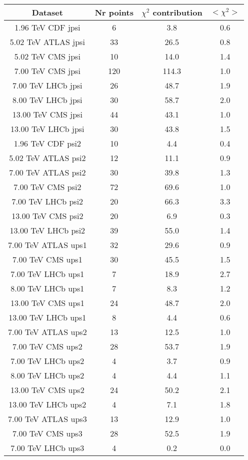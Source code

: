 \begin{table}[h!]
\centering
\begin{tabular}{c|c|c|c}
Dataset & Nr points & $\chi^2$ contribution & $<\chi^2>$ \\
\hline
1.96 TeV CDF jpsi & 6 & 3.8 & 0.6 \\
5.02 TeV ATLAS jpsi & 33 & 26.5 & 0.8 \\
5.02 TeV CMS jpsi & 10 & 14.0 & 1.4 \\
7.00 TeV CMS jpsi & 120 & 114.3 & 1.0 \\
7.00 TeV LHCb jpsi & 26 & 48.7 & 1.9 \\
8.00 TeV LHCb jpsi & 30 & 58.7 & 2.0 \\
13.00 TeV CMS jpsi & 44 & 43.1 & 1.0 \\
13.00 TeV LHCb jpsi & 30 & 43.8 & 1.5 \\
1.96 TeV CDF psi2 & 10 & 4.4 & 0.4 \\
5.02 TeV ATLAS psi2 & 12 & 11.1 & 0.9 \\
7.00 TeV ATLAS psi2 & 30 & 39.8 & 1.3 \\
7.00 TeV CMS psi2 & 72 & 69.6 & 1.0 \\
7.00 TeV LHCb psi2 & 20 & 66.3 & 3.3 \\
13.00 TeV CMS psi2 & 20 & 6.9 & 0.3 \\
13.00 TeV LHCb psi2 & 39 & 55.0 & 1.4 \\
7.00 TeV ATLAS ups1 & 32 & 29.6 & 0.9 \\
7.00 TeV CMS ups1 & 30 & 45.5 & 1.5 \\
7.00 TeV LHCb ups1 & 7 & 18.9 & 2.7 \\
8.00 TeV LHCb ups1 & 7 & 8.3 & 1.2 \\
13.00 TeV CMS ups1 & 24 & 48.7 & 2.0 \\
13.00 TeV LHCb ups1 & 8 & 4.4 & 0.6 \\
7.00 TeV ATLAS ups2 & 13 & 12.5 & 1.0 \\
7.00 TeV CMS ups2 & 28 & 53.7 & 1.9 \\
7.00 TeV LHCb ups2 & 4 & 3.7 & 0.9 \\
8.00 TeV LHCb ups2 & 4 & 4.4 & 1.1 \\
13.00 TeV CMS ups2 & 24 & 50.2 & 2.1 \\
13.00 TeV LHCb ups2 & 4 & 7.1 & 1.8 \\
7.00 TeV ATLAS ups3 & 13 & 12.9 & 1.0 \\
7.00 TeV CMS ups3 & 28 & 52.5 & 1.9 \\
7.00 TeV LHCb ups3 & 4 & 0.2 & 0.0 \\

\end{tabular}
\end{table}
